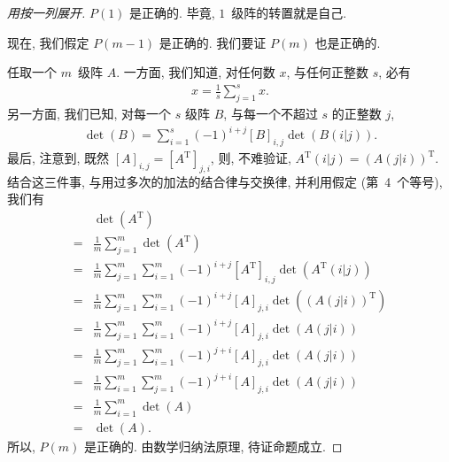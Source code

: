 \begin{proof}[用按一列展开]
    \(P(1)\) 是正确的.
    毕竟, \(1\)~级阵的转置就是自己.

    现在, 我们假定 \(P(m-1)\) 是正确的.
    我们要证 \(P(m)\) 也是正确的.

    任取一个 \(m\)~级阵 \(A\).
    一方面, 我们知道,
    对任何数 \(x\), 与任何正整数 \(s\),
    必有
    \begin{align*}
        x = \frac{1}{s} \sum_{j = 1}^{s} {x}.
    \end{align*}
    另一方面, 我们已知,
    对每一个 \(s\) 级阵 \(B\),
    与每一个不超过 \(s\) 的正整数 \(j\),
    \begin{align*}
        \det {(B)}
        = \sum_{i = 1}^{s} {(-1)^{i+j} [B]_{i,j} \det {(B(i|j))}}.
    \end{align*}
    最后, 注意到, 既然
    \([A]_{i,j} = [A^{\mathrm{T}}]_{j,i}\),
    则, 不难验证,
    \(A^{\mathrm{T}}(i|j) = (A(j|i))^{\mathrm{T}}\).
    结合这三件事,
    与用过多次的加法的结合律与交换律,
    并利用假定 (第~4~个等号), 我们有
    \begin{align*}
             & \det {(A^{\mathrm{T}})}
        \\
        = {} &
        \frac{1}{m}
        \sum_{j=1}^{m}
        {\det {(A^{\mathrm{T}})}}
        \\
        = {} &
        \frac{1}{m}
        \sum_{j=1}^{m} {
        \sum_{i=1}^{m} {
        (-1)^{i+j} [A^{\mathrm{T}}]_{i,j}
        \det {(A^{\mathrm{T}}(i|j))}}}
        \\
        = {} &
        \frac{1}{m}
        \sum_{j=1}^{m} {
        \sum_{i=1}^{m} {
        (-1)^{i+j} [A]_{j,i}
        \det {((A(j|i))^{\mathrm{T}})}}}
        \\
        = {} &
        \frac{1}{m}
        \sum_{j=1}^{m} {
        \sum_{i=1}^{m} {
        (-1)^{i+j} [A]_{j,i}
        \det {(A(j|i))}}}
        \\
        = {} &
        \frac{1}{m}
        \sum_{j=1}^{m} {
        \sum_{i=1}^{m} {
        (-1)^{j+i} [A]_{j,i}
        \det {(A(j|i))}}}
        \\
        = {} &
        \frac{1}{m}
        \sum_{i=1}^{m} {
        \sum_{j=1}^{m} {
        (-1)^{j+i} [A]_{j,i}
        \det {(A(j|i))}}}
        \\
        = {} &
        \frac{1}{m}
        \sum_{i=1}^{m}
        {\det {(A)}}
        \\
        = {} & \det {(A)}.
    \end{align*}
    所以, \(P(m)\) 是正确的.
    由数学归纳法原理, 待证命题成立.
\end{proof}

